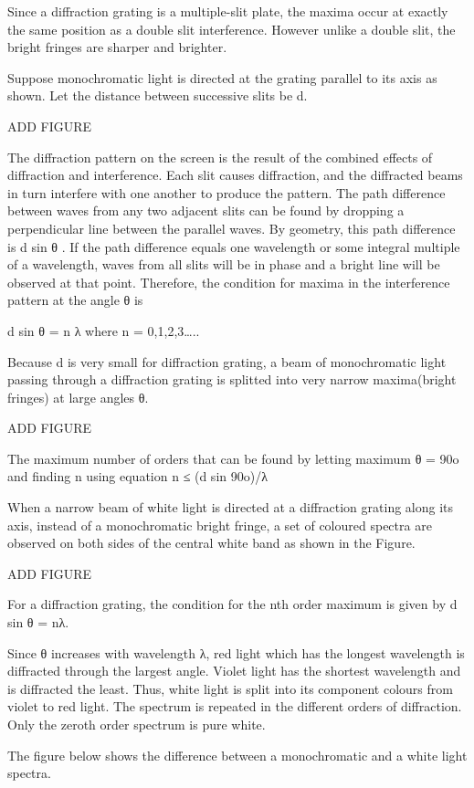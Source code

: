 Since a diffraction grating is a multiple-slit plate, the maxima occur at exactly the same position as a double slit interference. However unlike a double slit, the bright fringes are sharper and brighter.

Suppose monochromatic light is directed at the grating parallel to its axis as shown. Let the distance between successive slits be d.

ADD FIGURE

The diffraction pattern on the screen is the result of the combined effects of diffraction and interference. Each slit causes diffraction, and the diffracted beams in turn interfere with one another to produce the pattern. The path difference between waves from any two adjacent slits can be found by dropping a perpendicular line between the parallel waves. By geometry, this path difference is d sin θ . If the path difference equals one wavelength or some integral multiple of a wavelength, waves from all slits will be in phase and a bright line will be observed at that point. Therefore, the condition for maxima in the interference pattern at the angle θ is 

d sin θ = n λ
where n = 0,1,2,3…..

Because d is very small for diffraction grating, a beam of monochromatic light passing through a diffraction grating is splitted into very narrow maxima(bright fringes) at large angles θ.

ADD FIGURE

The maximum number of orders that can be found by letting maximum θ = 90o and finding n using equation
n ≤ (d sin 90o)/λ

When a narrow beam of white light is directed at a diffraction grating along its axis, instead of a monochromatic bright fringe, a set of coloured spectra are observed on both sides of the central white band as shown in the Figure.

ADD FIGURE

For a diffraction grating, the condition for the nth order maximum is given by d sin θ = nλ.

Since θ increases with wavelength λ, red light which has the longest wavelength is diffracted through the largest angle. Violet light has the shortest wavelength and is diffracted the least. Thus, white light is split into its component colours from violet to red light. The spectrum is repeated in the different orders of diffraction. Only the zeroth order spectrum is pure white.

The figure below shows the difference between a monochromatic and a white light spectra.

